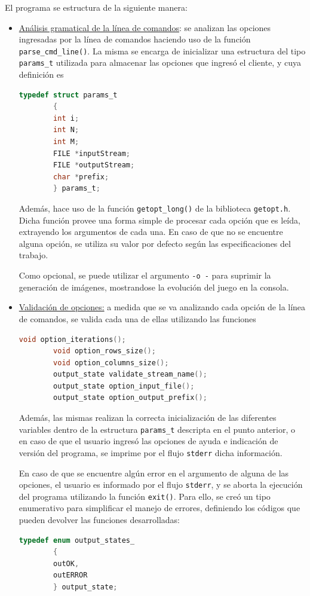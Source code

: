 \documentclass[a4paper,12pt]{article}
\numberwithin{equation}{section}
\numberwithin{figure}{section}
\begin{document}
	El programa se estructura de la siguiente manera:
	\begin{itemize}
		\item \underline{Análisis gramatical de la línea de comandos}: se analizan las opciones ingresadas por la línea de comandos haciendo uso de la función \texttt{parse\_cmd\_line()}. La misma se encarga de inicializar una estructura del tipo \texttt{params\_t} utilizada para almacenar las opciones que ingresó el cliente, y cuya definición es
		\begin{lstlisting}[language=C, style=StyleC]
		typedef struct params_t
		{
		int i;
		int N;
		int M;
		FILE *inputStream;
		FILE *outputStream;
		char *prefix;
		} params_t;
		\end{lstlisting}
		Además, hace uso de la función \texttt{getopt\_long()} de la biblioteca \texttt{getopt.h}. Dicha función provee una forma simple de procesar cada opción que es leída, extrayendo los argumentos de cada una. En caso de que no se encuentre alguna opción, se utiliza su valor por defecto según las especificaciones del trabajo.
		
		Como opcional, se puede utilizar el argumento \texttt{-o -} para suprimir la generación de imágenes, mostrandose la evolución del juego en la consola.
		
		\item \underline{Validación de opciones:} a medida que se va analizando cada opción de la línea de comandos, se valida cada una de ellas utilizando las funciones 
		\begin{lstlisting}[language=C, style=StyleC]
		void option_iterations();
		void option_rows_size();
		void option_columns_size();
		output_state validate_stream_name();
		output_state option_input_file();
		output_state option_output_prefix();
		\end{lstlisting}
		Además, las mismas realizan la correcta inicialización de las diferentes variables dentro de la estructura \texttt{params\_t} descripta en el punto anterior, o en caso de que el usuario ingresó las opciones de ayuda e indicación de versión del programa, se imprime por el flujo \texttt{stderr} dicha información.
		
		En caso de que se encuentre algún error en el argumento de alguna de las opciones, el usuario es informado por el flujo \texttt{stderr}, y se aborta la ejecución del programa utilizando la función \texttt{exit()}. Para ello, se creó un tipo enumerativo para simplificar el manejo de errores, definiendo los códigos que pueden devolver las funciones desarrolladas:
		\begin{lstlisting}[language=C, style=StyleC]
		typedef enum output_states_
		{
		outOK,
		outERROR
		} output_state;
		\end{lstlisting}
		

\end{itemize}
\end{document}
